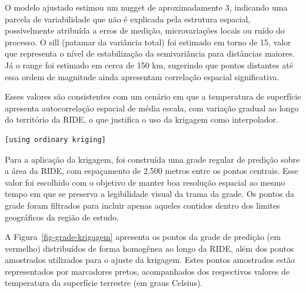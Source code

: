 \documentclass[
  letterpaper,
  DIV=11,
  numbers=noendperiod]{scrartcl}
\begin{document}
O modelo ajustado estimou um nugget de aproximadamente 3, indicando uma
parcela de variabilidade que não é explicada pela estrutura espacial,
possivelmente atribuída a erros de medição, microvariações locais ou
ruído do processo. O sill (patamar da variância total) foi estimado em
torno de 15, valor que representa o nível de estabilização da
semivariância para distâncias maiores. Já o range foi estimado em cerca
de 150 km, sugerindo que pontos distantes até essa ordem de magnitude
ainda apresentam correlação espacial significativa.

Esses valores são consistentes com um cenário em que a temperatura de
superfície apresenta autocorrelação espacial de média escala, com
variação gradual ao longo do território da RIDE, o que justifica o uso
da krigagem como interpolador.

\begin{verbatim}
[using ordinary kriging]
\end{verbatim}

Para a aplicação da krigagem, foi construída uma grade regular de
predição sobre a área da RIDE, com espaçamento de 2.500 metros entre os
pontos centrais. Esse valor foi escolhido com o objetivo de manter boa
resolução espacial ao mesmo tempo em que se preserva a legibilidade
visual da trama da grade. Os pontos da grade foram filtrados para
incluir apenas aqueles contidos dentro dos limites geográficos da região
de estudo.

A Figura~\ref{fig-grade-krigagem} apresenta os pontos da grade de
predição (em vermelho) distribuídos de forma homogênea ao longo da RIDE,
além dos pontos amostrados utilizados para o ajuste da krigagem. Estes
pontos amostrados estão representados por marcadores pretos,
acompanhados dos respectivos valores de temperatura da superfície
terrestre (em graus Celsius).
\end{document}
